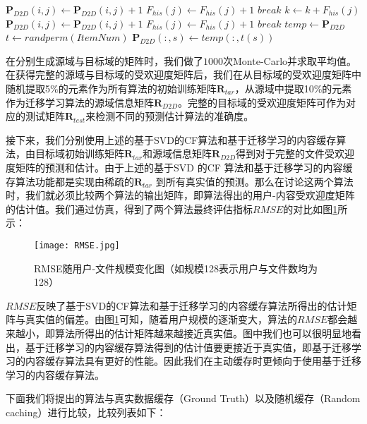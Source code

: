 \documentclass[bachelor]{seuthesis} %
\begin{document}
\begin{Main}
\begin{algorithm}
\begin{algorithmic}[1]
                    \State $\textbf{P}_{D2D}(i,j)\gets\textbf{P}_{D2D}(i,j)+1$
                    \State $F_{his}(j)\gets F_{his}(j)+1$
                    \State $break$
                \EndIf
                \State $k\gets k+F_{his}(j)$
                    \State $\textbf{P}_{D2D}(i,j)\gets\textbf{P}_{D2D}(i,j)+1$
                    \State $F_{his}(j)\gets F_{his}(j)+1$
                    \State $break$
                \EndIf
            \EndFor
        \EndFor
        \State $temp\gets\textbf{P}_{D2D}$
        \State $t\gets randperm(ItemNum)$
            \State $\textbf{P}_{D2D}(:,s)\gets temp(:,t(s))$
        \EndFor
    \end{algorithmic}
\end{algorithm}
在分别生成源域与目标域的矩阵时，我们做了$1000$次Monte-Carlo并求取平均值。在获得完整的源域与目标域的受欢迎度矩阵后，我们在从目标域的受欢迎度矩阵中随机提取5\%的元素作为所有算法的初始训练矩阵$\textbf{R}_{tar}$，从源域中提取10\%的元素作为迁移学习算法的源域信息矩阵$\textbf{R}_{D2D}$。完整的目标域的受欢迎度矩阵可作为对应的测试矩阵$\textbf{R}_{test}$来检测不同的预测估计算法的准确度。\par
接下来，我们分别使用上述的基于SVD的CF算法和基于迁移学习的内容缓存算法，由目标域初始训练矩阵$\textbf{R}_{tar}$和源域信息矩阵$\textbf{R}_{D2D}$得到对于完整的文件受欢迎度矩阵的预测和估计。由于上述的基于SVD 的CF 算法和基于迁移学习的内容缓存算法功能都是实现由稀疏的$\textbf{R}_{tar}$ 到所有真实值的预测。那么在讨论这两个算法时，我们就必须比较两个算法的输出矩阵，即算法得出的用户-内容受欢迎度矩阵的估计值。我们通过仿真，得到了两个算法最终评估指标$RMSE$的对比如图\ref{RMSEp}所示：\par
\begin{figure}{}
\centering
\texttt{[image: RMSE.jpg]}
\caption{RMSE随用户-文件规模变化图（如规模128表示用户与文件数均为128）}\label{RMSEp}
\end{figure}
$RMSE$反映了基于SVD的CF算法和基于迁移学习的内容缓存算法所得出的估计矩阵与真实值的偏差。由图\ref{RMSEp}可知，随着用户规模的逐渐变大，算法的$RMSE$都会越来越小，即算法所得出的估计矩阵越来越接近真实值。图中我们也可以很明显地看出，基于迁移学习的内容缓存算法得到的估计值要更接近于真实值，即基于迁移学习的内容缓存算法具有更好的性能。因此我们在主动缓存时更倾向于使用基于迁移学习的内容缓存算法。\par
下面我们将提出的算法与真实数据缓存（Ground Truth）以及随机缓存（Random caching）进行比较，比较列表如下：

\end{Main}
\end{document}
